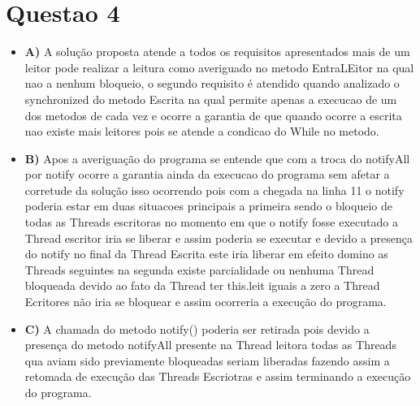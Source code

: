 \documentclass{article}
\begin{document}
\section{Questao 4}\label{questao-4}

\begin{itemize}
\tightlist
\item
  \textbf{A)} A solução proposta atende a todos os requisitos
  apresentados mais de um leitor pode realizar a leitura como averiguado
  no metodo EntraLEitor na qual nao a nenhum bloqueio, o segundo
  requisito é atendido quando analizado o synchronized do metodo Escrita
  na qual permite apenas a execucao de um dos metodos de cada vez e
  ocorre a garantia de que quando ocorre a escrita nao existe mais
  leitores pois se atende a condicao do While no metodo.
\item
  \textbf{B)} Apos a averiguação do programa se entende que com a troca
  do notifyAll por notify ocorre a garantia ainda da execucao do
  programa sem afetar a corretude da solução isso ocorrendo pois com a
  chegada na linha 11 o notify poderia estar em duas situacoes
  principais a primeira sendo o bloqueio de todas as Threads escritoras
  no momento em que o notify fosse executado a Thread escritor iria se
  liberar e assim poderia se executar e devido a presença do notify no
  final da Thread Escrita este iria liberar em efeito domino as Threads
  seguintes na segunda existe parcialidade ou nenhuma Thread bloqueada
  devido ao fato da Thread ter this.leit iguais a zero a Thread
  Ecritores não iria se bloquear e assim ocorreria a execução do
  programa.
\item
  \textbf{C)} A chamada do metodo notify() poderia ser retirada pois
  devido a presença do metodo notifyAll presente na Thread leitora todas
  as Threads qua aviam sido previamente bloqueadas seriam liberadas
  fazendo assim a retomada de execução das Threads Escriotras e assim
  terminando a execução do programa.
\end{itemize}
\end{document}
